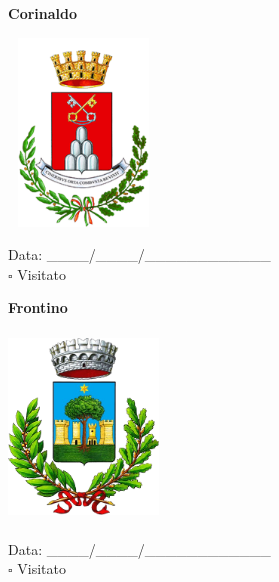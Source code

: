 \documentclass[a5paper,12pt]{article}
\begin{document}
\vspace{0.7cm}

\noindent
\begin{minipage}[t]{0.45\textwidth}
    \begin{center}
        \textbf{Corinaldo}
    \end{center}
    \vspace{-0.5cm} %
    \begin{center}
        \includegraphics[height= 5cm, width=4cm]{Marche/Stemma Corinaldo.png}
    \end{center}
    \vspace{-0.4cm} %
    \begin{flushleft}
        Data: \_\_\_\_/\_\_\_\_/\_\_\_\_\_\_\_\_\_\_\_\_ \\
        $\square$ Visitato
    \end{flushleft}
\end{minipage}
\hfill
\noindent
\begin{minipage}[t]{0.45\textwidth}
    \begin{center}
        \textbf{Frontino}
    \end{center}
    \vspace{-0.5cm} %
    \begin{center}
        \includegraphics[height= 5cm, width=4cm]{Marche/Stemma Frontino.png}
    \end{center}
    \vspace{-0.4cm} %
    \begin{flushleft}
        Data: \_\_\_\_/\_\_\_\_/\_\_\_\_\_\_\_\_\_\_\_\_ \\
        $\square$ Visitato
    \end{flushleft}
\end{minipage}
\end{document}
